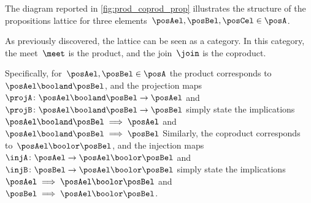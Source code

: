 The diagram reported in \cref{fig:prod_coprod_prop} illustrates the structure of the propositions lattice for three elements~$\posAel,\posBel,\posCel\in \posA$.

As previously discovered, the lattice can be seen as a category.
In this category, the meet~$\meet$ is the product, and the join~$\join$ is the coproduct.

Specifically, for~$\posAel,\posBel\in \posA$ the product corresponds to~$\posAel\booland \posBel$, and the projection maps~$\projA\colon \posAel\booland \posBel\to \posAel$ and~$\projB\colon \posAel\booland \posBel\to \posBel$ simply state the implications~$\posAel \booland \posBel \implies \posAel$ and~$\posAel \booland \posBel \implies \posBel$
Similarly, the coproduct corresponds to~$\posAel\boolor \posBel$, and the injection maps~$\injA\colon \posAel\to \posAel\boolor \posBel$ and~$\injB\colon \posBel\to \posAel\boolor \posBel$ simply state the implications~$\posAel \implies \posAel \boolor \posBel$ and~$\posBel \implies \posAel \boolor \posBel$.
